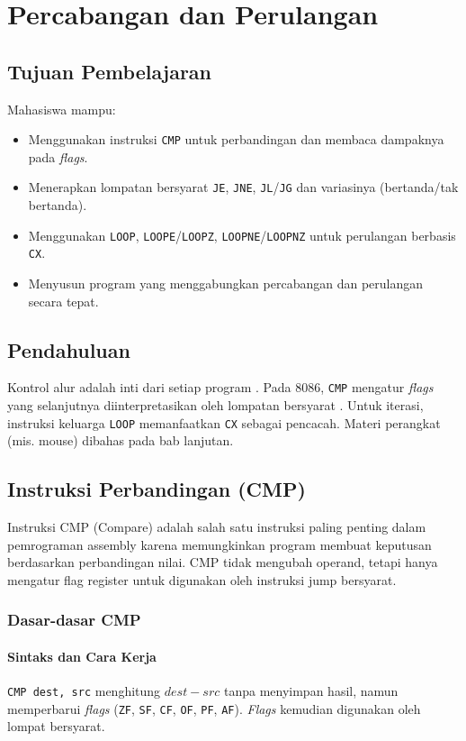 \documentclass[../main.tex]{subfiles}
\begin{document}
\chapter{Percabangan dan Perulangan}

\section{Tujuan Pembelajaran}
Mahasiswa mampu:
\begin{itemize}
    \item Menggunakan instruksi \texttt{CMP} untuk perbandingan dan membaca dampaknya pada \textit{flags}.
    \item Menerapkan lompatan bersyarat \texttt{JE}, \texttt{JNE}, \texttt{JL}/\texttt{JG} dan variasinya (bertanda/tak bertanda).
    \item Menggunakan \texttt{LOOP}, \texttt{LOOPE}/\texttt{LOOPZ}, \texttt{LOOPNE}/\texttt{LOOPNZ} untuk perulangan berbasis \texttt{CX}.
    \item Menyusun program yang menggabungkan percabangan dan perulangan secara tepat.
\end{itemize}

\section{Pendahuluan}
Kontrol alur adalah inti dari setiap program \cite{tutorials_point_assembly}. Pada 8086, \texttt{CMP} mengatur \textit{flags} yang selanjutnya diinterpretasikan oleh lompatan bersyarat \cite{8086_instruction_set_reference}. Untuk iterasi, instruksi keluarga \texttt{LOOP} memanfaatkan \texttt{CX} sebagai pencacah. Materi perangkat (mis. mouse) dibahas pada bab lanjutan.

\section{Instruksi Perbandingan (CMP)}
        Instruksi CMP (Compare) adalah salah satu instruksi paling penting dalam pemrograman assembly karena memungkinkan program membuat keputusan berdasarkan perbandingan nilai. CMP tidak mengubah operand, tetapi hanya mengatur flag register untuk digunakan oleh instruksi jump bersyarat.

\subsection{Dasar-dasar CMP}
            \subsubsection{Sintaks dan Cara Kerja}
\texttt{CMP dest, src} menghitung \(dest - src\) tanpa menyimpan hasil, namun memperbarui \textit{flags} (\texttt{ZF}, \texttt{SF}, \texttt{CF}, \texttt{OF}, \texttt{PF}, \texttt{AF}). \textit{Flags} kemudian digunakan oleh lompat bersyarat.
\end{document}
